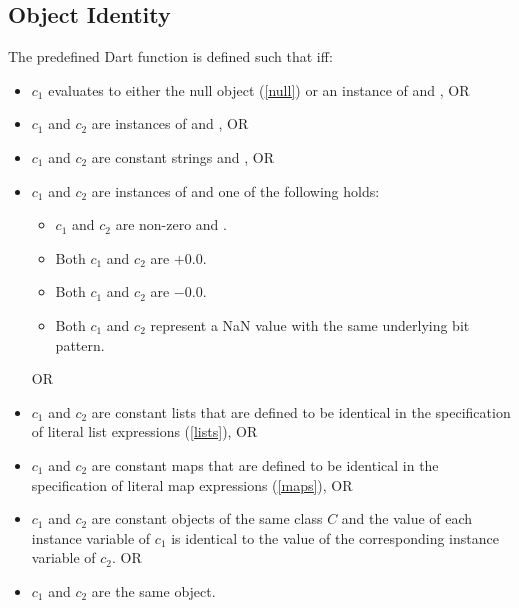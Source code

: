 \documentclass[makeidx]{article}
\begin{document}
\subsection{Object Identity}

\LMHash{}%
The predefined Dart function  is defined such that  if{}f:
\begin{itemize}
\item $c_1$ evaluates to either the null object (\ref{null}) or an instance of  and , OR
\item $c_1$ and $c_2$ are instances of  and , OR
\item $c_1$ and $c_2$ are constant strings and , OR
\item $c_1$ and $c_2$ are instances of  and one of the following holds:
  \begin{itemize}
  \item $c_1$ and $c_2$ are non-zero and .
  \item Both $c_1$ and $c_2$ are $+0.0$.
  \item Both $c_1$ and $c_2$ are $-0.0$.
  \item Both $c_1$ and $c_2$ represent a NaN value with the same underlying bit pattern.
  \end{itemize}
 OR
\item $c_1$ and $c_2$ are constant lists that are defined to be identical in the specification of literal list expressions (\ref{lists}), OR
\item $c_1$ and $c_2$ are constant maps that are defined to be identical in the specification of literal map expressions (\ref{maps}), OR
\item $c_1$ and $c_2$ are constant objects of the same class $C$ and the value of each instance variable of $c_1$ is identical to the value of the corresponding instance variable of $c_2$. OR
\item $c_1$ and $c_2$ are the same object.
\end{itemize}


\end{document}
